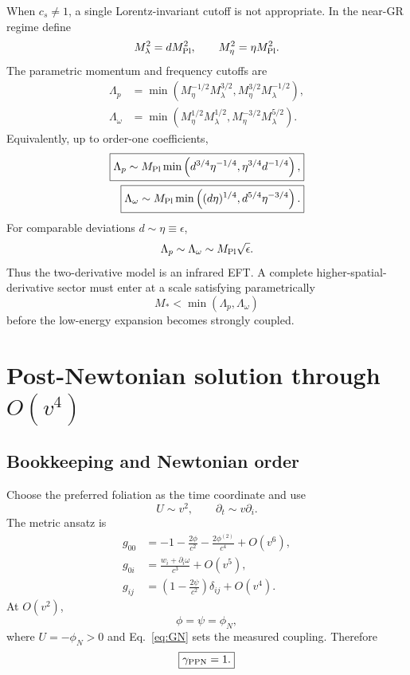 \documentclass[11pt]{article}
\newcommand{\Mpl}{M_{\rm Pl}}
\newcommand{\Ms}{M_*}
\newcommand{\cs}{c_s}
\newcommand{\gppn}{\gamma_{\rm PPN}}
\begin{document}
When $\cs\neq1$, a single Lorentz-invariant cutoff is not appropriate.  In the near-GR regime define
\begin{equation}
M_\lambda^2=d\Mpl^2,\qquad M_\eta^2=\eta\Mpl^2.
\end{equation}
The parametric momentum and frequency cutoffs are
\begin{align}
\Lambda_p&=\min\left(M_\eta^{-1/2}M_\lambda^{3/2},
M_\eta^{3/2}M_\lambda^{-1/2}\right),
\label{eq:LpM}\\
\Lambda_\omega&=\min\left(M_\eta^{1/2}M_\lambda^{1/2},
M_\eta^{-3/2}M_\lambda^{5/2}\right).
\label{eq:LwM}
\end{align}
Equivalently, up to order-one coefficients,
\begin{align}
\boxed{\Lambda_p\sim\Mpl\min\left(d^{3/4}\eta^{-1/4},
\eta^{3/4}d^{-1/4}\right),}
\label{eq:Lp}\\
\boxed{\Lambda_\omega\sim\Mpl\min\left((d\eta)^{1/4},
d^{5/4}\eta^{-3/4}\right).}
\label{eq:Lw}
\end{align}
For comparable deviations $d\sim\eta\equiv\epsilon$,
\begin{equation}
\Lambda_p\sim\Lambda_\omega\sim\Mpl\sqrt\epsilon.
\label{eq:comparablecutoff}
\end{equation}
Thus the two-derivative model is an infrared EFT.  A complete higher-spatial-derivative sector must enter at a scale satisfying parametrically
\begin{equation}
\Ms<\min(\Lambda_p,\Lambda_\omega)
\label{eq:UVcondition}
\end{equation}
before the low-energy expansion becomes strongly coupled.

\section{Post-Newtonian solution through $O(v^4)$}
\label{sec:PPN}

\subsection{Bookkeeping and Newtonian order}

Choose the preferred foliation as the time coordinate and use
\begin{equation}
U\sim v^2,\qquad \partial_t\sim v\partial_i.
\end{equation}
The metric ansatz is
\begin{align}
g_{00}&=-1-\frac{2\phi}{c^2}-\frac{2\phi^{(2)}}{c^4}+O(v^6),\nonumber\\
g_{0i}&=\frac{w_i+\partial_i\omega}{c^3}+O(v^5),\nonumber\\
g_{ij}&=\left(1-\frac{2\psi}{c^2}\right)\delta_{ij}+O(v^4).
\label{eq:PPNansatz}
\end{align}
At $O(v^2)$,
\begin{equation}
\phi=\psi=\phi_N,
\end{equation}
where $U=-\phi_N>0$ and Eq.~\eqref{eq:GN} sets the measured coupling.  Therefore
\begin{equation}
\boxed{\gppn=1.}
\end{equation}
\end{document}
